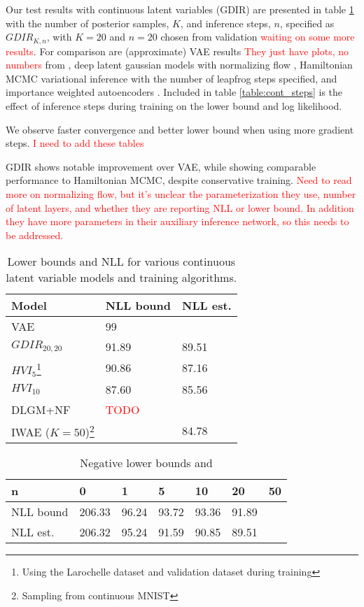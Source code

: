 \documentclass{article} %
\newcommand{\alert}[1]{\textcolor{red}{#1}}
\begin{document}
Our test results with continuous latent variables (GDIR) are presented in table \ref{table:continuous} with the number of posterior samples, $K$, and inference steps, $n$, specified as $GDIR_{K, n}$, with $K=20$ and $n=20$ chosen from validation \alert{waiting on some more results}. For comparison are (approximate) VAE results \alert{They just have plots, no numbers} from \citep{kingma2013auto}, deep latent gaussian models with normalizing flow \citep[DLGM+NF,][]{rezende2015variational}, Hamiltonian MCMC variational inference \citep[HVI,][]{salimans2014markov} with the number of leapfrog steps specified, and importance weighted autoencoders \citep[IWAE,][]{burda2015importance}. Included in table \ref{table:cont_steps} is the effect of inference steps during training on the lower bound and log likelihood.

We observe faster convergence and better lower bound when using more gradient steps. \alert{I need to add these tables}

GDIR shows notable improvement over VAE, while showing comparable performance to Hamiltonian MCMC, despite conservative training. \alert{Need to read more on normalizing flow, but it's unclear the parameterization they use, number of latent layers, and whether they are reporting NLL or lower bound. In addition they have more parameters in their auxiliary inference network, so this needs to be addressed.}

\begin{table}
\label{table:continuous}
\begin{tabular}{ | m{8em} | m{1cm}| m{1cm} | } 
\hline
Model & NLL bound & NLL est. \\ 
\hline
\hline
VAE \footnote[1] & 99 &  \\ 
\hline
\hline
$GDIR_{20, 20}$ & 91.89 & 89.51 \\ 
\hline
\hline
$HVI_5$\footnote[2]{Using the Larochelle dataset and validation dataset during training} &  90.86 & 87.16 \\ 
$HVI_{10}$\footnote[2] & 87.60 & 85.56 \\ 
\hline
DLGM+NF & \alert{TODO} &\\
\hline
IWAE ($K=50$)\footnote[3]{Sampling from continuous MNIST} & & 84.78 \\ 
\hline
\end{tabular}
\caption{Lower bounds and NLL for various continuous latent variable models and training algorithms.}
\end{table}

\begin{table}
\label{table:cont_step}
\begin{tabular}{ | m{1cm} | m{1cm} | m{1cm} | m{1cm} | m{1cm} | m{1cm} | m{1cm} |}
\hline
n & 0 & 1 & 5 & 10 & 20 & 50 \\
\hline
NLL bound & 206.33 & 96.24 & 93.72 & 93.36 & 91.89 & \\
\hline
NLL est. & 206.32 & 95.24 & 91.59 & 90.85 & 89.51 & \\
\hline
\end{tabular}
\caption{Negative lower bounds and }
\end{table}
\end{document}
